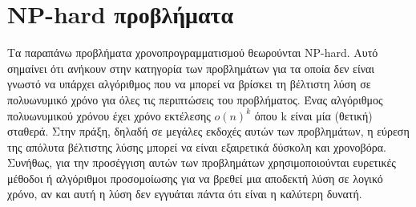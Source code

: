 \documentclass{article}
\begin{document}
\section * {NP-hard προβλήματα}
Τα παραπάνω προβλήματα χρονοπρογραμματισμού θεωρούνται NP-hard. Αυτό σημαίνει ότι ανήκουν στην κατηγορία των προβλημάτων για τα οποία δεν είναι γνωστό να υπάρχει αλγόριθμος που να μπορεί να βρίσκει τη βέλτιστη λύση σε πολυωνυμικό χρόνο για όλες τις περιπτώσεις του προβλήματος. Ένας αλγόριθμος πολυωνυμικού χρόνου έχει χρόνο εκτέλεσης $o(n)^k$ όπου k είναι μία (θετική) σταθερά. Στην πράξη, δηλαδή σε μεγάλες εκδοχές αυτών των προβλημάτων, η εύρεση της απόλυτα βέλτιστης λύσης μπορεί να είναι εξαιρετικά δύσκολη και χρονοβόρα. Συνήθως, για την προσέγγιση αυτών των προβλημάτων χρησιμοποιούνται ευρετικές μέθοδοι ή αλγόριθμοι προσομοίωσης για να βρεθεί μια αποδεκτή λύση σε λογικό χρόνο, αν και αυτή η λύση δεν εγγυάται πάντα ότι είναι η καλύτερη δυνατή.
\end{document}
